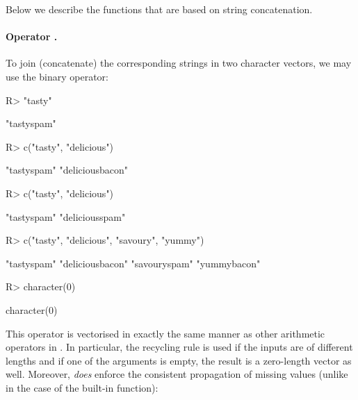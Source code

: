 \documentclass[nojss]{jss}
\begin{document}
Below we describe the functions that are based on string concatenation.


\paragraph{Operator .}
To join (concatenate) the corresponding strings in two character vectors,
we may use the binary  operator:

\begin{Schunk}
\begin{Sinput}
R> "tasty" %s+% "spam"
\end{Sinput}
\begin{Soutput}
[1] "tastyspam"
\end{Soutput}
\begin{Sinput}
R> c("tasty", "delicious") %s+% c("spam", "bacon")  # elementwise
\end{Sinput}
\begin{Soutput}
[1] "tastyspam"      "deliciousbacon"
\end{Soutput}
\begin{Sinput}
R> c("tasty", "delicious") %s+% "spam"              # recycling rule
\end{Sinput}
\begin{Soutput}
[1] "tastyspam"     "deliciousspam"
\end{Soutput}
\begin{Sinput}
R> c("tasty", "delicious", "savoury", "yummy") %s+% c("spam", "bacon")
\end{Sinput}
\begin{Soutput}
[1] "tastyspam"      "deliciousbacon" "savouryspam"    "yummybacon"
\end{Soutput}
\begin{Sinput}
R> character(0) %s+% c("spam", "bacon")
\end{Sinput}
\begin{Soutput}
character(0)
\end{Soutput}
\end{Schunk}

This operator is vectorised in exactly the same manner
as other arithmetic operators in .
In particular, the recycling rule is used if the inputs are of different
lengths and if one of the arguments is empty, the result is a zero-length
vector as well. Moreover,  \textit{does} enforce the consistent
propagation of missing values
(unlike in the case of the built-in 
function):
\end{document}
